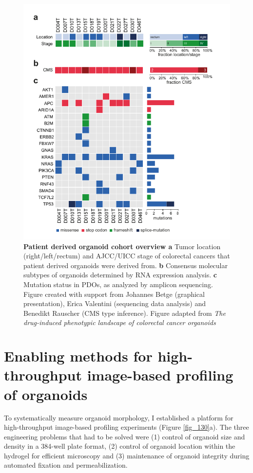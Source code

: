 \begin{flushleft}
\clearpage
\begin{figure}[h]
\centering
\includegraphics[width=\textwidth,
                height=\textheight,
                keepaspectratio]{figures/promise/pdf/fig_1_0.pdf}
\caption[Patient derived organoid cohort overview]{\textbf{Patient derived organoid cohort overview a} Tumor location (right/left/rectum) and AJCC/UICC stage of colorectal cancers that patient derived organoids were derived from. \textbf{b}  Consensus molecular subtypes of organoids determined by RNA expression analysis. \textbf{c} Mutation status in PDOs, as analyzed by amplicon sequencing. Figure created with support from Johannes Betge (graphical presentation),  Erica Valentini (sequencing data analysis) and Benedikt Rauscher (CMS type inference). Figure adapted from \textit{The drug-induced phenotypic landscape of colorectal cancer organoids} \citep{Betge2022-kr}}
\label{fig_120}
\end{figure}
\clearpage


\section{Enabling methods for high-throughput image-based profiling of organoids}
To systematically measure organoid morphology, I established a platform for high-throughput image-based profiling experiments (Figure \ref{fig_130}a). The three engineering problems that had to be solved were (1) control of organoid size and density in a 384-well plate format, (2) control of organoid location within the hydrogel for efficient microscopy and (3) maintenance of organoid integrity during automated fixation and permeabilization. 


\end{flushleft}

